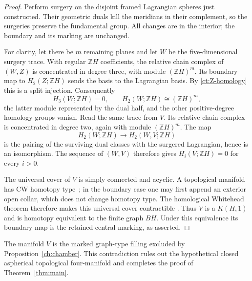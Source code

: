 \documentclass[11pt]{article}
\theoremstyle{definition}
\theoremstyle{remark}
\newcommand{\Z}{\mathbb Z}
\begin{document}
\begin{proof}
Perform surgery on the disjoint framed Lagrangian spheres just
constructed.  Their geometric duals kill the meridians in their
complement, so the surgeries preserve the fundamental group.
All changes are in the interior; the boundary and its marking are
unchanged.

For clarity, let there be $m$ remaining planes and let $W$ be the
five-dimensional surgery trace.  With regular $\Z H$ coefficients,
the relative chain complex of $(W,Z)$ is concentrated in degree
three, with module $(\Z H)^m$.  Its boundary map to
$H_2(Z;\Z H)$ sends the basis to the Lagrangian basis.  By
\eqref{ct:Z-homology} this is a split injection.  Consequently
\[
 H_3(W;\Z H)=0,\qquad
 H_2(W;\Z H)\cong(\Z H)^m,
\]
the latter module represented by the dual half, and the other
positive-degree homology groups vanish.  Read the same trace from
$V$.  Its relative chain complex is concentrated in degree two,
again with module $(\Z H)^m$.  The map
\[
            H_2(W;\Z H)\longrightarrow H_2(W,V;\Z H)
\]
is the pairing of the surviving dual classes with the surgered
Lagrangian, hence is an isomorphism.  The sequence of $(W,V)$
therefore gives $H_i(V;\Z H)=0$ for every $i>0$.

The universal cover of $V$ is simply connected and acyclic. A
topological manifold has CW homotopy type~\cite[Corollary~1]{MilnorCW};
in the boundary case one may first append an exterior open collar,
which does not change homotopy type. The homological Whitehead theorem
therefore makes this universal cover contractible
\cite[Corollary~4.33]{Hatcher}. Thus $V$ is a $K(H,1)$ and is homotopy equivalent
to the finite graph $BH$.  Under this equivalence its boundary
map is the retained central marking, as asserted.
\end{proof}

The manifold $V$ is the marked graph-type filling excluded by
Proposition~\ref{ch:chamber}.  This contradiction rules out the hypothetical
closed aspherical topological four-manifold and completes the proof
of Theorem~\ref{thm:main}.
\end{document}
